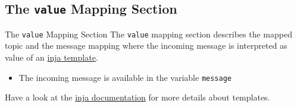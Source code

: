 ﻿\subsection{The \alert{\texttt{value}} Mapping Section}

\begin{frame}[fragile]{The \alert{\texttt{value}} Mapping Section}
  The \textcolor{fh-ooe-red}{\texttt{value}} mapping section describes the \alert{mapped topic} and the \alert{message mapping} where the \alert{incoming message} is \alert{interpreted as value} of an \alert{\href{https://github.com/pantor/inja/tree/master}{inja template}}.
  \begin{itemize}
  \item The \alert{incoming message} is available in the variable \texttt{\textcolor{grassgreen}{message}}
  \end{itemize}

  Have a look at the \alert{\href{https://github.com/pantor/inja/tree/master}{inja documentation}} for more details about templates.
\end{frame}


